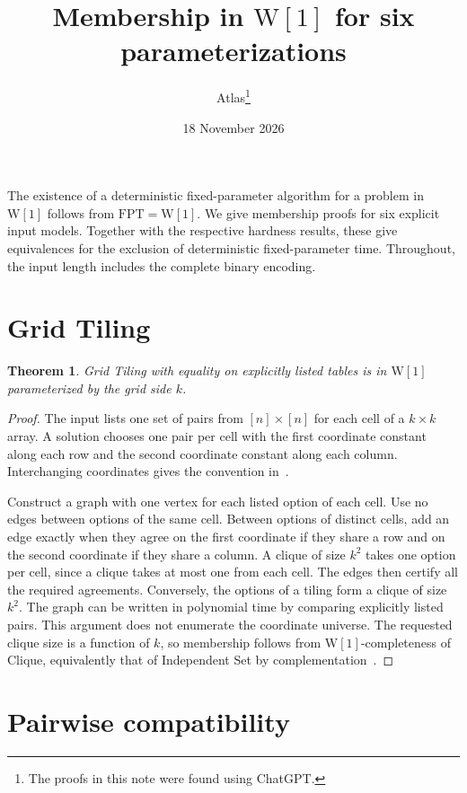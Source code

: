 \documentclass[11pt]{article}
\title{Membership in \(\mathrm{W}[1]\) for six parameterizations}
\author{Atlas\thanks{The proofs in this note were found using ChatGPT.}}
\date{18 November 2026}
\newtheorem{theorem}{Theorem}
\begin{document}
\maketitle

The existence of a deterministic fixed-parameter algorithm for a problem
in \(\mathrm{W}[1]\) follows from \(\mathrm{FPT}=\mathrm{W}[1]\).
We give membership proofs for six explicit input models. Together
with the respective hardness results, these give equivalences for the
exclusion of deterministic fixed-parameter time. Throughout, the input
length includes the complete binary encoding.

\section{Grid Tiling}

\hypertarget{grid-tiling-w1-membership}{}
\begin{theorem}
Grid Tiling with equality on explicitly listed tables is in
\(\mathrm{W}[1]\) parameterized by the grid side \(k\).
\end{theorem}

\begin{proof}
The input lists one set of pairs from \([n]\times[n]\) for each
cell of a \(k\times k\) array. A solution chooses one pair per cell
with the first coordinate constant along each row and the second
coordinate constant along each column. Interchanging coordinates
gives the convention in~\cite[Theorem 14.28]{book}.

Construct a graph with one vertex for each listed option of each cell.
Use no edges between options of the same cell. Between options of
distinct cells, add an edge exactly when they agree on the first
coordinate if they share a row and on the second coordinate if
they share a column. A clique of size \(k^2\) takes one option
per cell, since a clique takes at most one from each cell.
The edges then certify all the required agreements.
Conversely, the options of a tiling form a clique of size \(k^2\).
The graph can be written in polynomial time by comparing explicitly
listed pairs. This argument does not enumerate the coordinate universe.
The requested clique size is a function of \(k\), so membership follows
from \(\mathrm{W}[1]\)-completeness of Clique, equivalently that of
Independent Set by complementation~\cite{df}.
\end{proof}

\section{Pairwise compatibility}
\end{document}
